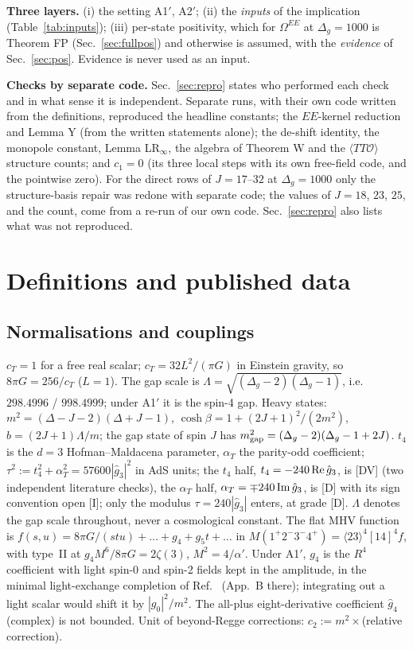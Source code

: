 \documentclass[aps,prl,onecolumn,superscriptaddress,nofootinbib]{revtex4-2}
\begin{document}
\textbf{Three layers.} (i) the setting A1$'$, A2$'$; (ii) the \emph{inputs} of the implication
(Table~\ref{tab:inputs}); (iii) per-state positivity, which for $\Omega^{EE}$ at $\Delta_g=1000$ is Theorem FP (Sec.~\ref{sec:fullpos}) and otherwise is assumed, with the \emph{evidence} of
Sec.~\ref{sec:pos}. Evidence is never used as an input.

\textbf{Checks by separate code.} Sec.~\ref{sec:repro} states who performed each check and in what sense it is independent. Separate
runs, with their own code written from the definitions, reproduced the headline constants; the $EE$-kernel reduction and Lemma Y (from
the written statements alone); the de-shift identity, the monopole constant, Lemma LR$_\infty$, the algebra of Theorem W and the
$\langle TT\mathcal O\rangle$ structure counts; and $c_1=0$ (its three local steps with its own free-field code, and the pointwise
zero). For the direct rows of $J=17$--$32$ at $\Delta_g=1000$ only the structure-basis repair was redone with separate code; the
values of $J=18$, $23$, $25$, and the count, come from a re-run of our own code. Sec.~\ref{sec:repro} also lists what was not reproduced.

\section{Definitions and published data}
\label{sec:defs}

\subsection{Normalisations and couplings}
$c_T=1$ for a free real scalar; $c_T=32L^2/(\pi G)$ in Einstein gravity, so $8\pi G=256/c_T$
($L=1$). The gap scale is $\Lambda=\sqrt{(\Delta_g-2)(\Delta_g-1)}$, i.e.\ $298.4996$ /
$998.4999$; under A1$'$ it is the spin-4 gap. Heavy states:
$m^2=(\Delta-J-2)(\Delta+J-1)$, $\cosh\beta=1+(2J+1)^2/(2m^2)$, $b=(2J+1)\Lambda/m$; the gap
state of spin $J$ has $m_{\rm gap}^2=(\Delta_g-2)(\Delta_g-1+2J)$. $t_4$ is the $d=3$
Hofman--Maldacena parameter, $\alpha_T$ the parity-odd coefficient; $\tau^2:=t_4^2+\alpha_T^2=57600|\hat
g_3|^2$ in AdS units; the $t_4$ half, $t_4=-240\,{\rm Re}\,\hat g_3$, is [DV] (two independent literature checks), the
$\alpha_T$ half, $\alpha_T=\mp240\,{\rm Im}\,\hat g_3$, is [D] with its sign convention open [I]; only the modulus
$\tau=240|\hat g_3|$ enters, at grade [D]. $\Lambda$ denotes the gap scale throughout, never a cosmological constant. The flat MHV function is
$f(s,u)=8\pi G/(stu)+\dots+g_4+g_5t+\dots$ in $M(1^+2^-3^-4^+)=\langle23\rangle^4[14]^4f$, with
type~II at $g_4M^6/8\pi G=2\zeta(3)$, $M^2=4/\alpha'$. Under A1$'$, $g_4$ is the $R^4$ coefficient with
light spin-0 and spin-2 fields kept in the amplitude, in the minimal light-exchange completion of
Ref.~\cite{CHLPS} (App.~B there); integrating out a light scalar would shift it by $|g_0|^2/m^2$. The
all-plus eight-derivative coefficient $\hat g_4$ (complex) is not bounded. Unit of beyond-Regge
corrections: $c_2:=m^2\times$(relative correction).
\end{document}
